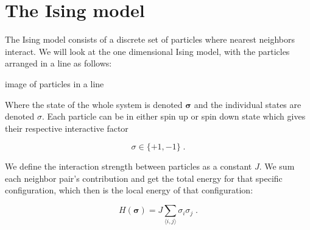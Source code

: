 \section{The Ising model}

The Ising model consists of a discrete set of particles where nearest neighbors interact. We will look at the one dimensional Ising model, with the particles arranged in a line as follows:

image of particles in a line

Where the state of the whole system is denoted $\boldsymbol{\sigma}$ and the individual states are denoted  $\sigma$. Each particle can be in either spin up or spin down state which gives their respective interactive factor

\begin{equation}
  \sigma \in \{+1,-1\} \; .
\end{equation}

We define the interaction strength between particles as a constant $J$. We sum each neighbor pair's contribution and get the total energy for that specific configuration, which then is the local energy of that configuration:

\begin{equation}
  H(\boldsymbol{\sigma}) =J\sum_{\langle i,j\rangle} \sigma_i\sigma_j \; .
  \label{eq:Ising_hamiltonian}
\end{equation}


